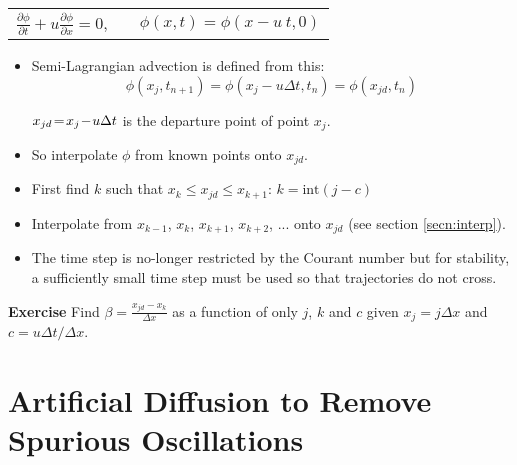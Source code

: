 \begin{minipage}{0.59\linewidth}\setlength{\parskip}{6pt}
{\centering\begin{tabulary}{\linewidth}{CCC}
$\frac{\partial \phi}{\partial t} + u\frac{\partial \phi}{\partial x} = 0$, && $\phi(x,t) = \phi(x-u~t, 0)$ \\
\end{tabulary}}
\begin{itemize}
\item Semi-Lagrangian advection is defined from this:
\begin{equation*}
\phi(x_j,t_{n+1}) = \phi(x_j-u\Delta t, t_n) = \phi(x_{jd},t_n)
\end{equation*}

$x_{jd}\negthinspace = \negthinspace x_j\negthinspace - \negthinspace u\Delta t$ is the departure point of point $x_j$.

\item So interpolate $\phi$ from known points onto $x_{jd}$.

\item First find $k$ such that $x_k \le x_{jd}\le x_{k+1}$:
$k = \text{int}(j - c)$

\item Interpolate from $x_{k-1}$, $x_{k}$, $x_{k+1}$, $x_{k+2}$, ... onto $x_{jd}$ (see section \ref{secn:interp}).
\end{itemize}
\end{minipage}\hfill
\begin{minipage}{0.39\linewidth}
\end{minipage}

\begin{itemize}
\item The time step is no-longer restricted by the Courant number but
for stability, a sufficiently small time step must be used so that trajectories do not cross.
\end{itemize}

{\bf Exercise} 
Find $\beta=\frac{x_{jd}-x_k}{\Delta x}$ as a function of only $j$, $k$ and $c$ given $x_j=j\Delta x$ and $c=u\Delta t/\Delta x$.\\

\clearpage
\section{Artificial Diffusion to Remove Spurious Oscillations}

